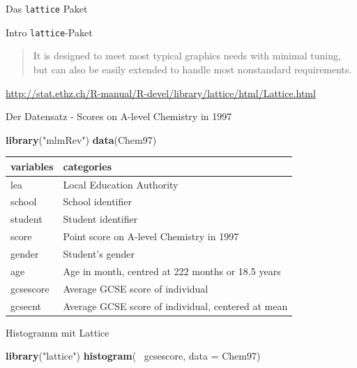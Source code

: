 \documentclass[ignorenonframetext,]{beamer}
\newenvironment{Shaded}{}{}
\newcommand{\KeywordTok}[1]{\textcolor[rgb]{0.00,0.44,0.13}{\textbf{{#1}}}}
\newcommand{\DataTypeTok}[1]{\textcolor[rgb]{0.56,0.13,0.00}{{#1}}}
\newcommand{\StringTok}[1]{\textcolor[rgb]{0.25,0.44,0.63}{{#1}}}
\newcommand{\NormalTok}[1]{{#1}}
\begin{document}
\begin{frame}[fragile]{Das \texttt{lattice} Paket}

\begin{block}{Intro \texttt{lattice}-Paket}

\begin{quote}
It is designed to meet most typical graphics needs with minimal tuning,
but can also be easily extended to handle most nonstandard requirements.
\end{quote}

\url{http://stat.ethz.ch/R-manual/R-devel/library/lattice/html/Lattice.html}

\end{block}

\begin{block}{Der Datensatz - Scores on A-level Chemistry in 1997}

\begin{Shaded}
\begin{Highlighting}[]
\KeywordTok{library}\NormalTok{(}\StringTok{"mlmRev"}\NormalTok{)}
\KeywordTok{data}\NormalTok{(Chem97)}
\end{Highlighting}
\end{Shaded}

\begin{longtable}[]{@{}ll@{}}
\toprule
variables & categories\tabularnewline
\midrule
\endhead
lea & Local Education Authority\tabularnewline
school & School identifier\tabularnewline
student & Student identifier\tabularnewline
score & Point score on A-level Chemistry in 1997\tabularnewline
gender & Student's gender\tabularnewline
age & Age in month, centred at 222 months or 18.5 years\tabularnewline
gcsescore & Average GCSE score of individual\tabularnewline
gcsecnt & Average GCSE score of individual, centered at
mean\tabularnewline
\bottomrule
\end{longtable}

\end{block}

\begin{block}{Histogramm mit Lattice}

\begin{Shaded}
\begin{Highlighting}[]
\KeywordTok{library}\NormalTok{(}\StringTok{"lattice"}\NormalTok{)}
\KeywordTok{histogram}\NormalTok{(~}\StringTok{ }\NormalTok{gcsescore, }\DataTypeTok{data =} \NormalTok{Chem97)}
\end{Highlighting}
\end{Shaded}


\end{block}
\end{frame}
\end{document}
